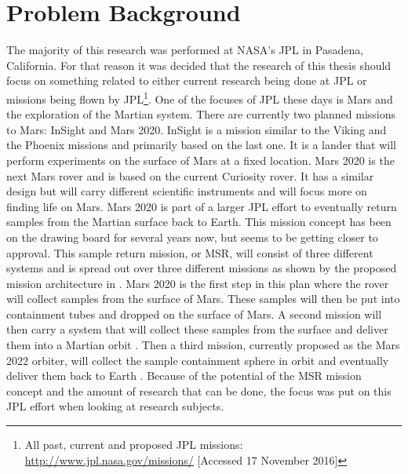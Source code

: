 \chapter{Problem Background}

\label{ch:problembackground}
The majority of this research was performed at \ac{NASA}'s \ac{JPL} in Pasadena, California. For that reason it was decided that the research of this thesis should focus on something related to either current research being done at \ac{JPL} or missions being flown by \ac{JPL}\footnote{All past, current and proposed \ac{JPL} missions: \url{http://www.jpl.nasa.gov/missions/} [Accessed 17 November 2016]}.   One of the focuses of \ac{JPL} these days is Mars and the exploration of the Martian system. There are currently two planned missions to Mars: InSight and Mars 2020. InSight is a mission similar to the Viking and the Phoenix missions and primarily based on the last one. It is a lander that will perform experiments on the surface of Mars at a fixed location. Mars 2020 is the next Mars rover and is based on the current Curiosity rover. It has a similar design but will carry different scientific instruments and will focus more on finding life on Mars. Mars 2020 is part of a larger \ac{JPL} effort to eventually return samples from the Martian surface back to Earth. This mission concept has been on the drawing board for several years now, but seems to be getting closer to approval. This sample return mission, or \ac{MSR}, will consist of three different systems and is spread out over three different missions as shown by the proposed mission architecture in . Mars 2020 is the first step in this plan where the rover will collect samples from the surface of Mars. These samples will then be put into containment tubes and dropped on the surface of Mars. A second mission will then carry a system that will collect these samples from the surface and deliver them into a Martian orbit \citep{shotwell2016drivers}. Then a third mission, currently proposed as the Mars 2022 orbiter, will collect the sample containment sphere in orbit and eventually deliver them back to Earth \citep{woolley2011mars}. Because of the potential of the \ac{MSR} mission concept and the amount of research that can be done, the focus was put on this \ac{JPL} effort when looking at research subjects.


